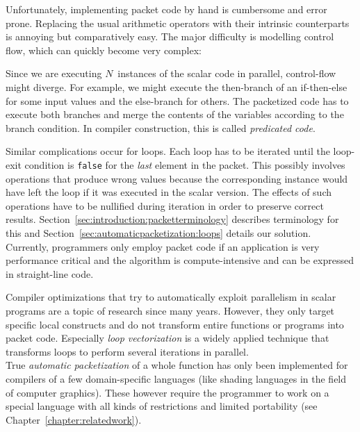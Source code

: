 Unfortunately, implementing packet code by hand is cumbersome and error prone.
Replacing the usual arithmetic operators with their intrinsic counterparts is annoying but comparatively easy.
The major difficulty is modelling control flow, which can quickly become very complex:

Since we are executing $N$~instances of the scalar code in parallel, control-flow might diverge.
For example, we might execute the then-branch of an if-then-else for some input values and the else-branch for others.
The packetized code has to execute both branches and merge the contents of the variables according to the branch condition.
In compiler construction, this is called \emph{predicated code}.

Similar complications occur for loops.
Each loop has to be iterated until the loop-exit condition is \texttt{false} for the \emph{last} element in the packet.
This possibly involves operations that produce wrong values because the corresponding instance would have left the loop if it was executed in the scalar version.
The effects of such operations have to be nullified during iteration in order to preserve correct results.
Section~\ref{sec:introduction:packetterminology} describes terminology for this and Section~\ref{sec:automaticpacketization:loops} details our solution.\\

Currently, programmers only employ packet code if an application is very performance critical and the algorithm is compute-intensive and can be expressed in straight-line code.

Compiler optimizations that try to automatically exploit parallelism in scalar programs are a topic of research since many years.
However, they only target specific local constructs and do not transform entire functions or programs into packet code.
Especially \emph{loop vectorization} is a widely applied technique that transforms loops to perform several iterations in parallel.\\

True \emph{automatic packetization} of a whole function has only been implemented for compilers of a few domain-specific languages (like shading languages in the field of computer graphics).
These however require the programmer to work on a special language with all kinds of restrictions and limited portability (see Chapter~\ref{chapter:relatedwork}).

